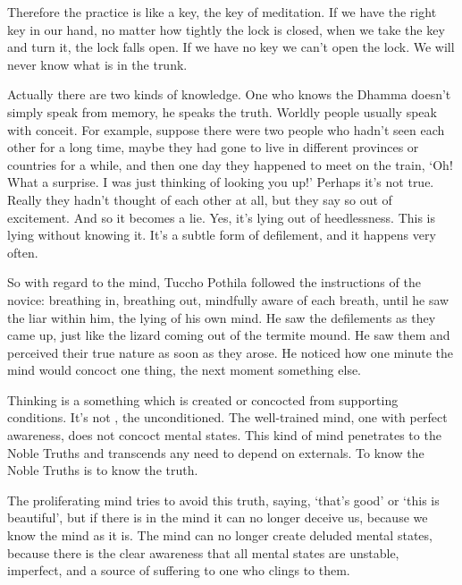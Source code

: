 Therefore the practice is like a key, the key of meditation. If we have the right key in our hand, no matter how tightly the lock is closed, when we take the key and turn it, the lock falls open. If we have no key we can't open the lock. We will never know what is in the trunk.

Actually there are two kinds of knowledge. One who knows the Dhamma doesn't simply speak from memory, he speaks the truth. Worldly people usually speak with conceit. For example, suppose there were two people who hadn't seen each other for a long time, maybe they had gone to live in different provinces or countries for a while, and then one day they happened to meet on the train, `Oh! What a surprise. I was just thinking of looking you up!' Perhaps it's not true. Really they hadn't thought of each other at all, but they say so out of excitement. And so it becomes a lie. Yes, it's lying out of heedlessness. This is lying without knowing it. It's a subtle form of defilement, and it happens very often.

So with regard to the mind, Tuccho Pothila followed the instructions of the novice: breathing in, breathing out, mindfully aware of each breath, until he saw the liar within him, the lying of his own mind. He saw the defilements as they came up, just like the lizard coming out of the termite mound. He saw them and perceived their true nature as soon as they arose. He noticed how one minute the mind would concoct one thing, the next moment something else.

Thinking is a  something which is created or concocted from supporting conditions. It's not , the unconditioned. The well-trained mind, one with perfect awareness, does not concoct mental states. This kind of mind penetrates to the Noble Truths and transcends any need to depend on externals. To know the Noble Truths is to know the truth.

The proliferating mind tries to avoid this truth, saying, `that's good' or `this is beautiful', but if there is  in the mind it can no longer deceive us, because we know the mind as it is. The mind can no longer create deluded mental states, because there is the clear awareness that all mental states are unstable, imperfect, and a source of suffering to one who clings to them.

